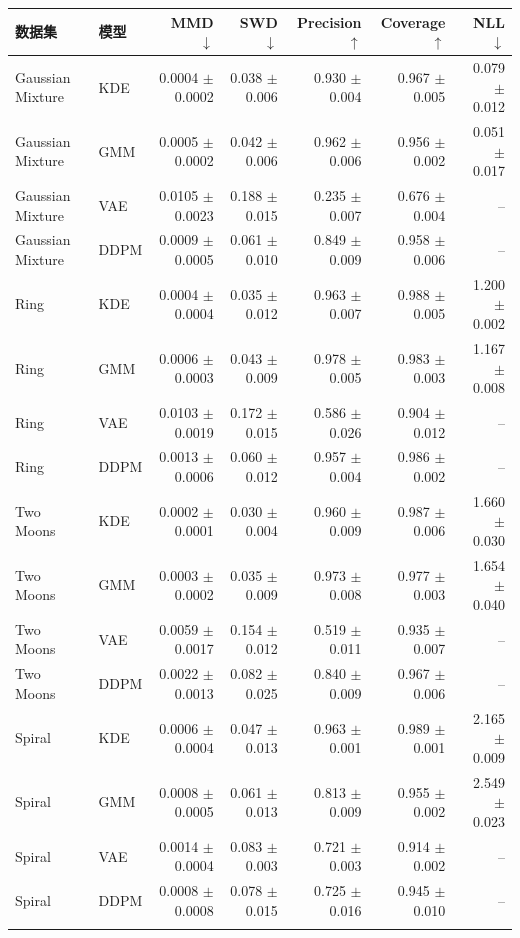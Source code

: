 \begin{tabular}{llrrrrr}
\toprule
数据集 & 模型 & MMD $\downarrow$ & SWD $\downarrow$ & Precision $\uparrow$ & Coverage $\uparrow$ & NLL $\downarrow$ \\
\midrule
Gaussian Mixture & KDE & 0.0004 $\pm$ 0.0002 & 0.038 $\pm$ 0.006 & 0.930 $\pm$ 0.004 & 0.967 $\pm$ 0.005 & 0.079 $\pm$ 0.012 \\
Gaussian Mixture & GMM & 0.0005 $\pm$ 0.0002 & 0.042 $\pm$ 0.006 & 0.962 $\pm$ 0.006 & 0.956 $\pm$ 0.002 & 0.051 $\pm$ 0.017 \\
Gaussian Mixture & VAE & 0.0105 $\pm$ 0.0023 & 0.188 $\pm$ 0.015 & 0.235 $\pm$ 0.007 & 0.676 $\pm$ 0.004 & -- \\
Gaussian Mixture & DDPM & 0.0009 $\pm$ 0.0005 & 0.061 $\pm$ 0.010 & 0.849 $\pm$ 0.009 & 0.958 $\pm$ 0.006 & -- \\
\addlinespace
Ring & KDE & 0.0004 $\pm$ 0.0004 & 0.035 $\pm$ 0.012 & 0.963 $\pm$ 0.007 & 0.988 $\pm$ 0.005 & 1.200 $\pm$ 0.002 \\
Ring & GMM & 0.0006 $\pm$ 0.0003 & 0.043 $\pm$ 0.009 & 0.978 $\pm$ 0.005 & 0.983 $\pm$ 0.003 & 1.167 $\pm$ 0.008 \\
Ring & VAE & 0.0103 $\pm$ 0.0019 & 0.172 $\pm$ 0.015 & 0.586 $\pm$ 0.026 & 0.904 $\pm$ 0.012 & -- \\
Ring & DDPM & 0.0013 $\pm$ 0.0006 & 0.060 $\pm$ 0.012 & 0.957 $\pm$ 0.004 & 0.986 $\pm$ 0.002 & -- \\
\addlinespace
Two Moons & KDE & 0.0002 $\pm$ 0.0001 & 0.030 $\pm$ 0.004 & 0.960 $\pm$ 0.009 & 0.987 $\pm$ 0.006 & 1.660 $\pm$ 0.030 \\
Two Moons & GMM & 0.0003 $\pm$ 0.0002 & 0.035 $\pm$ 0.009 & 0.973 $\pm$ 0.008 & 0.977 $\pm$ 0.003 & 1.654 $\pm$ 0.040 \\
Two Moons & VAE & 0.0059 $\pm$ 0.0017 & 0.154 $\pm$ 0.012 & 0.519 $\pm$ 0.011 & 0.935 $\pm$ 0.007 & -- \\
Two Moons & DDPM & 0.0022 $\pm$ 0.0013 & 0.082 $\pm$ 0.025 & 0.840 $\pm$ 0.009 & 0.967 $\pm$ 0.006 & -- \\
\addlinespace
Spiral & KDE & 0.0006 $\pm$ 0.0004 & 0.047 $\pm$ 0.013 & 0.963 $\pm$ 0.001 & 0.989 $\pm$ 0.001 & 2.165 $\pm$ 0.009 \\
Spiral & GMM & 0.0008 $\pm$ 0.0005 & 0.061 $\pm$ 0.013 & 0.813 $\pm$ 0.009 & 0.955 $\pm$ 0.002 & 2.549 $\pm$ 0.023 \\
Spiral & VAE & 0.0014 $\pm$ 0.0004 & 0.083 $\pm$ 0.003 & 0.721 $\pm$ 0.003 & 0.914 $\pm$ 0.002 & -- \\
Spiral & DDPM & 0.0008 $\pm$ 0.0008 & 0.078 $\pm$ 0.015 & 0.725 $\pm$ 0.016 & 0.945 $\pm$ 0.010 & -- \\
\addlinespace
\bottomrule
\end{tabular}
